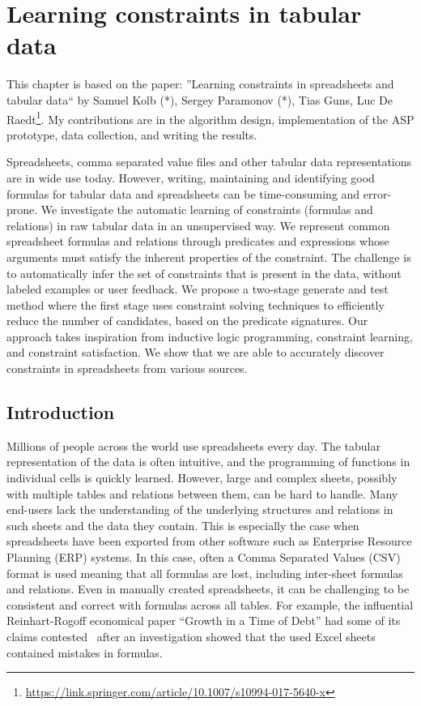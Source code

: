 \chapter{Learning constraints in tabular data}\label{ch:TaCLe}
This chapter is based on the paper: ''Learning constraints in spreadsheets and tabular data`` by Samuel Kolb (*), Sergey Paramonov (*), Tias Guns, Luc De Raedt\footnote{\url{https://link.springer.com/article/10.1007/s10994-017-5640-x}}. My contributions are in the algorithm design, implementation of the ASP prototype, data collection, and writing the results.


Spreadsheets, comma separated value files and other tabular data representations are in wide use today.
However, writing, maintaining and identifying good formulas for tabular data and spreadsheets can be time-consuming and error-prone.
We investigate the automatic learning of constraints (formulas and relations) in raw tabular data in an unsupervised way.
We represent common spreadsheet formulas and relations through predicates and expressions whose arguments must satisfy the inherent properties of the constraint. The challenge is to automatically infer the set of constraints that is present in the data, without labeled examples or user feedback. 
We propose a two-stage generate and test method where the first stage uses constraint solving techniques to efficiently reduce the number of candidates, based on the predicate signatures. 
Our approach takes inspiration from inductive logic programming, constraint learning, and constraint satisfaction.
We show that we are able to accurately discover constraints in spreadsheets from various sources.

\section{Introduction}
Millions of people across the world use spreadsheets every day.
The tabular representation of the data is often intuitive, and the programming of functions in individual cells is quickly learned.
However, large and complex sheets, possibly with multiple tables and relations between them, can be hard to handle.
Many end-users lack the understanding of the underlying structures and relations in such sheets and the data they contain.
This is especially the case when spreadsheets have been exported from other software such as Enterprise Resource Planning (ERP) systems.
In this case, often a Comma Separated Values (CSV) format is used meaning that all formulas are lost, including inter-sheet formulas and relations.
Even in manually created spreadsheets, it can be challenging to be consistent and correct with formulas across all tables.
For example, the influential Reinhart-Rogoff economical paper ``Growth in a Time of Debt'' \parencite{growth_in_time_of_debt} had some of its claims contested~\parencite{flaw_excel} after an investigation showed that the used Excel sheets contained mistakes in formulas.

